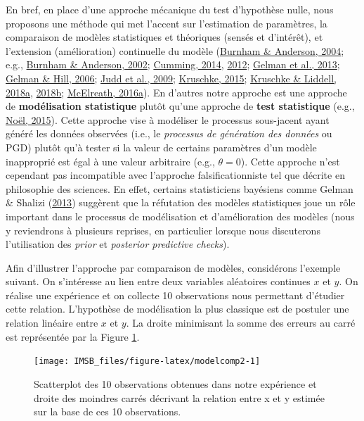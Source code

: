\documentclass[
  a4paper,11pt,twoside,onecolumn,openright,final,oldfontcommands]{memoir}
\theoremstyle{definition}
\theoremstyle{definition}
\theoremstyle{definition}
\theoremstyle{definition}
\theoremstyle{remark}
\begin{document}
En bref, en place d'une approche mécanique du test d'hypothèse nulle, nous proposons une méthode qui met l'accent sur l'estimation de paramètres, la comparaison de modèles statistiques et théoriques (sensés et d'intérêt), et l'extension (amélioration) continuelle du modèle (\protect\hyperlink{ref-burnham_multimodel_2004}{Burnham \& Anderson, 2004}; e.g., \protect\hyperlink{ref-burnham_model_2002}{Burnham \& Anderson, 2002}; \protect\hyperlink{ref-cumming_new_2014}{Cumming, 2014}, \protect\hyperlink{ref-Cumming2012}{2012}; \protect\hyperlink{ref-gelman_bayesian_2013}{Gelman et al., 2013}; \protect\hyperlink{ref-gelman_data_2006}{Gelman \& Hill, 2006}; \protect\hyperlink{ref-judd_data_2009}{Judd et al., 2009}; \protect\hyperlink{ref-kruschke_doing_2015}{Kruschke, 2015}; \protect\hyperlink{ref-kruschke_bayesian_2018}{Kruschke \& Liddell, 2018a}, \protect\hyperlink{ref-kruschke_bayesian_2018-1}{2018b}; \protect\hyperlink{ref-R-rethinking}{McElreath, 2016a}). En d'autres notre approche est une approche de \textbf{modélisation statistique} plutôt qu'une approche de \textbf{test statistique} (e.g., \protect\hyperlink{ref-noel_psychologie_2015}{Noël, 2015}). Cette approche vise à modéliser le processus sous-jacent ayant généré les données observées (i.e., le \emph{processus de génération des données} ou PGD) plutôt qu'à tester si la valeur de certains paramètres d'un modèle inapproprié est égal à une valeur arbitraire (e.g., \(\theta = 0\)). Cette approche n'est cependant pas incompatible avec l'approche falsificationniste tel que décrite en philosophie des sciences. En effet, certains statisticiens bayésiens comme Gelman \& Shalizi (\protect\hyperlink{ref-gelman_philosophy_2013}{2013}) suggèrent que la réfutation des modèles statistiques joue un rôle important dans le processus de modélisation et d'amélioration des modèles (nous y reviendrons à plusieurs reprises, en particulier lorsque nous discuterons l'utilisation des \emph{prior} et \emph{posterior predictive checks}).

Afin d'illustrer l'approche par comparaison de modèles, considérons l'exemple suivant. On s'intéresse au lien entre deux variables aléatoires continues \(x\) et \(y\). On réalise une expérience et on collecte 10 observations nous permettant d'étudier cette relation. L'hypothèse de modélisation la plus classique est de postuler une relation linéaire entre \(x\) et \(y\). La droite minimisant la somme des erreurs au carré est représentée par la Figure \ref{fig:modelcomp2}.

\begin{figure}[!htb]

{\centering \texttt{[image: IMSB\_files/figure-latex/modelcomp2-1]} 

}

\caption{Scatterplot des 10 observations obtenues dans notre expérience et droite des moindres carrés décrivant la relation entre x et y estimée sur la base de ces 10 observations.}\label{fig:modelcomp2}
\end{figure}
\end{document}
